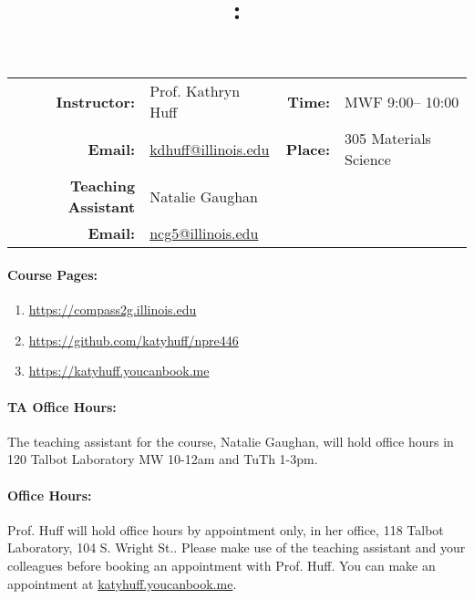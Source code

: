 \documentclass[11pt]{article}
\title{\CourseNumber: \CourseTitle\\}
\author{\CourseUniversity}
\date{\CourseSemester \CourseYear}
\makeatletter
\newcommand{\CourseInstructor}{Prof. Kathryn Huff\xspace}%
\newcommand{\CourseDays}{MWF\xspace}%
\newcommand{\CourseStart}{9:00\xspace}%
\newcommand{\CourseEnd}{10:00\xspace}%
\newcommand{\CourseInstructorEmail}{kdhuff@illinois.edu}
\newcommand{\CourseRoom}{305\xspace}%
\newcommand{\CourseBuilding}{Materials Science\xspace}%
\newcommand{\TeachingAssistant}{Natalie Gaughan\xspace}%
\newcommand{\TAEmail}{ncg5@illinois.edu}%
\newcommand{\TAOfficeHourPlace}{120 Talbot Laboratory\xspace}
\newcommand{\HuffOfficeHourPlace}{118 Talbot Laboratory, 104 S. Wright St.\xspace}
\makeatother
\begin{document}
\maketitle
\renewcommand{\arraystretch}{1.5}
\begin{center}
\begin{table}[h]
\begin{tabularx}{\textwidth}{rXrX}
\hline
\textbf{Instructor:} & \CourseInstructor & \textbf{Time:} & \CourseDays \CourseStart -- \CourseEnd \\
\textbf{Email:} &  \href{mailto:\CourseInstructorEmail}{\CourseInstructorEmail} & \textbf{Place:} & \CourseRoom \CourseBuilding\\
\textbf{Teaching Assistant} & \TeachingAssistant & & \\
\textbf{Email:} &  \href{mailto:\TAEmail}{\TAEmail} & & \\
\hline
\end{tabularx}
\end{table}
\end{center}

\paragraph{Course Pages:}
\begin{enumerate}
        \item \url{https://compass2g.illinois.edu}
        \item \url{https://github.com/katyhuff/npre446}
        \item \url{https://katyhuff.youcanbook.me}
\end{enumerate}

\paragraph{TA Office Hours:} The teaching assistant for the course, 
\TeachingAssistant, will hold office hours 
in \TAOfficeHourPlace  MW 10-12am and TuTh 1-3pm.

\paragraph{Office Hours:} Prof. Huff will hold office hours by appointment 
only, in her office, \HuffOfficeHourPlace. Please make use of the teaching 
assistant and your colleagues before booking an appointment with Prof. Huff. 
You can make  an appointment at \url{katyhuff.youcanbook.me}.
\end{document}
